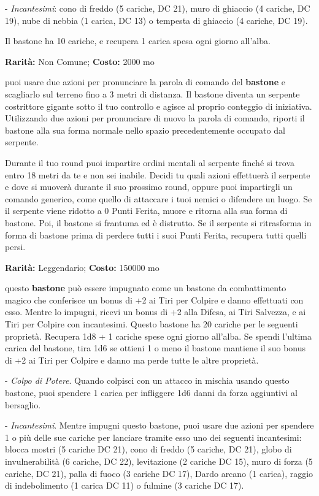 \begin{multicols}{2}
- \emph{Incantesimi}: cono di freddo (5 cariche, DC 21), muro di ghiaccio (4 cariche, DC 19), nube di nebbia (1 carica, DC 13) o tempesta di ghiaccio (4 cariche, DC 19).

Il bastone ha 10 cariche, e recupera 1 carica spesa ogni giorno all'alba.


\textbf{Rarità:} Non Comune; \textbf{Costo:} 2000 mo

puoi usare due azioni per pronunciare la parola di comando del \textbf{bastone} e scagliarlo sul terreno fino a 3 metri di distanza. Il bastone diventa un serpente costrittore gigante sotto il tuo controllo e agisce al proprio conteggio di iniziativa. Utilizzando due azioni per pronunciare di nuovo la parola di comando, riporti il bastone alla sua forma normale nello spazio precedentemente occupato dal serpente.

Durante il tuo round puoi impartire ordini mentali al serpente finché si trova entro 18 metri da te e non sei inabile. Decidi tu quali azioni effettuerà il serpente e dove si muoverà durante il suo prossimo round, oppure puoi impartirgli un comando generico, come quello di attaccare i tuoi nemici o difendere un luogo. Se il serpente viene ridotto a 0 Punti Ferita, muore e ritorna alla sua forma di bastone. Poi, il bastone si frantuma ed è distrutto. Se il serpente si ritrasforma in forma di bastone prima di perdere tutti i suoi Punti Ferita, recupera tutti quelli persi.


\textbf{Rarità:} Leggendario; \textbf{Costo:} 150000 mo

questo \textbf{bastone} può essere impugnato come un bastone da combattimento magico che conferisce un bonus di +2 ai Tiri per Colpire e danno effettuati con esso. Mentre lo impugni, ricevi un bonus di +2 alla Difesa, ai Tiri Salvezza, e ai Tiri per Colpire con incantesimi. Questo bastone ha 20 cariche per le seguenti proprietà. Recupera 1d8 + 1 cariche spese ogni giorno all'alba. Se spendi l'ultima carica del bastone, tira 1d6 se ottieni 1 o meno il bastone mantiene il suo bonus di +2 ai Tiri per Colpire e danno ma perde tutte le altre proprietà.

- \emph{Colpo di Potere}. Quando colpisci con un attacco in mischia usando questo bastone, puoi spendere 1 carica per infliggere 1d6 danni da forza aggiuntivi al bersaglio.

- \emph{Incantesimi}. Mentre impugni questo bastone, puoi usare due azioni per spendere 1 o più delle sue cariche per lanciare tramite esso uno dei seguenti incantesimi: blocca mostri (5 cariche DC 21), cono di freddo (5 cariche, DC 21), globo di invulnerabilità (6 cariche, DC 22), levitazione (2 cariche DC 15), muro di forza (5 cariche, DC 21), palla di fuoco (3 cariche DC 17), Dardo arcano (1 carica), raggio di indebolimento (1 carica DC 11) o fulmine (3 cariche DC 17).


\end{multicols}

